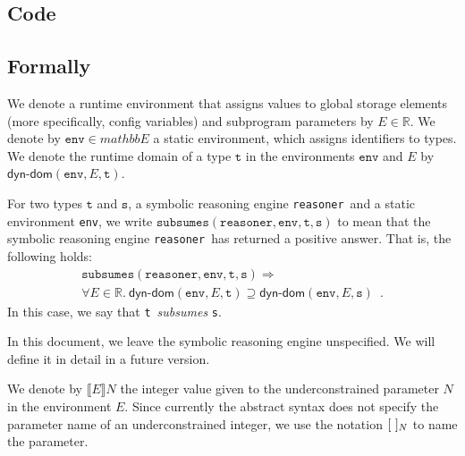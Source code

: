 \documentclass{book}
\newcommand\dynamicdomain[0]{\textsf{dyn-dom}}
\newcommand\tenv[0]{\texttt{env}}
\newcommand\vt[0]{\texttt{t}}
\newcommand\vs[0]{\texttt{s}}
\begin{document}
  \subsection{Code}

\begin{emptyformal}
      \subsection{Formally}
      \newcommand\runtimeenv[0]{E}

      \newcommand\subsumes[0]{\texttt{subsumes}}
      \newcommand\reasoner[0]{\texttt{reasoner}}

      We denote a runtime environment that assigns values to global storage elements (more specifically, config variables)
      and subprogram parameters by $E \in \mathbb{R}$.
      We denote by $\tenv \in mathbb{E}$ a static environment, which assigns identifiers to types.
      We denote the runtime domain of a type $\vt$ in the environments $\tenv$ and $E$ by $\dynamicdomain(\tenv, E, \vt)$.
      
      For two types $\vt$ and $\vs$, a symbolic reasoning engine \reasoner\ and a static environment \tenv,
      we write $\subsumes(\reasoner, \tenv, \vt, \vs)$ to mean that the symbolic reasoning
      engine \reasoner\ has returned a positive answer. That is, the following holds:
      \[
        \begin{array}{l}
        \subsumes(\reasoner, \tenv, \vt, \vs) \Rightarrow \\
       \forall E\in\mathbb{R}.\ \dynamicdomain(\tenv, E, \vt) \supseteq \dynamicdomain(\tenv, E, \vs) \enspace.
        \end{array}
      \]
      In this case, we say that \vt\ \emph{subsumes} \vs.

      In this document, we leave the symbolic reasoning engine unspecified. We will define it in detail in a future version.

We denote by $\llbracket \runtimeenv \rrbracket N$ the integer value given to the underconstrained parameter $N$ in the environment $\runtimeenv$.
%
Since currently the abstract syntax does not specify the parameter name of an underconstrained integer,
we use the notation $[\ ]_N$ to name the parameter.


\end{emptyformal}
\end{document}
